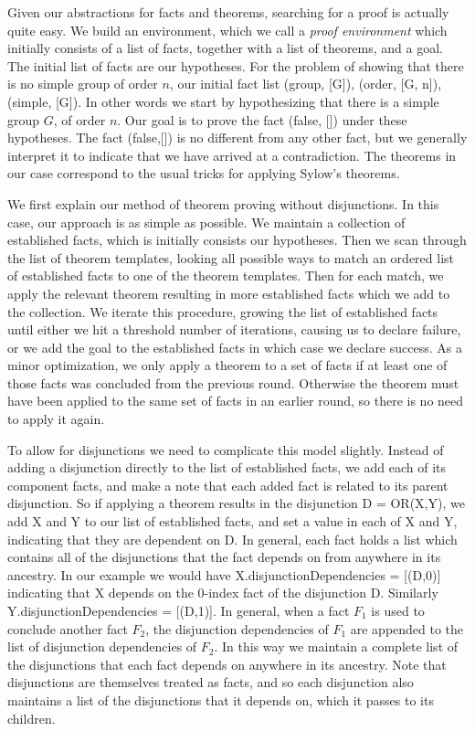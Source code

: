 \documentclass[11pt, oneside]{article}   	%
\begin{document}
Given our abstractions for facts and theorems, searching for a proof is actually quite easy.  We build an environment, which we call a \textit{proof environment} which initially consists of a list of facts, together with a list of theorems, and a goal.  The initial list of facts are our hypotheses.  For the problem of showing that there is no simple group of order $n$, our initial fact list (group, [G]), (order, [G, n]), (simple, [G]).  In other words we start by hypothesizing that there is a simple group $G$, of order $n$.  Our goal is to prove the fact (false, []) under these hypotheses.  The fact (false,[]) is no different from any other fact, but we generally interpret it to indicate that we have arrived at a contradiction.  The theorems in our case correspond to the usual tricks for applying Sylow's theorems.

We first explain our method of theorem proving without disjunctions.  In this case, our approach is as simple as possible. We maintain a collection of established facts, which is initially consists our hypotheses.  Then we scan through the list of theorem templates, looking all possible ways to match an ordered list of established facts to one of the theorem templates.  Then for each match, we apply the relevant theorem resulting in more established facts which we add to the collection.  We iterate this procedure, growing the list of established facts until either we hit a threshold number of iterations, causing us to declare failure, or we add the goal to the established facts in which case we declare success.  As a minor optimization, we only apply a theorem to a set of facts if at least one of those facts was concluded from the previous round.  Otherwise the theorem must have been applied to the same set of facts in an earlier round, so there is no need to apply it again.

To allow for disjunctions we need to complicate this model slightly.  Instead of adding a disjunction directly to the list of established facts, we add each of its component facts, and make a note that each added fact is related to its parent disjunction.  So if applying a theorem results in the disjunction D = OR(X,Y), we add X and Y to our list of established facts, and set a value in each of X and Y, indicating that they are dependent on D.  In general, each fact holds a list which contains all of the disjunctions that the fact depends on from anywhere in its ancestry.  In our example we would have X.disjunctionDependencies = [(D,0)] indicating that X depends on the 0-index fact of the disjunction D.  Similarly Y.disjunctionDependencies = [(D,1)].  In general, when a fact $F_1$ is used to conclude another fact $F_2$, the disjunction dependencies of $F_1$ are appended to the list of disjunction dependencies of $F_2$.  In this way we maintain a complete list of the disjunctions that each fact depends on anywhere in its ancestry.  Note that disjunctions are themselves treated as facts, and so each disjunction also maintains a list of the disjunctions that it depends on, which it passes to its children.
\end{document}
